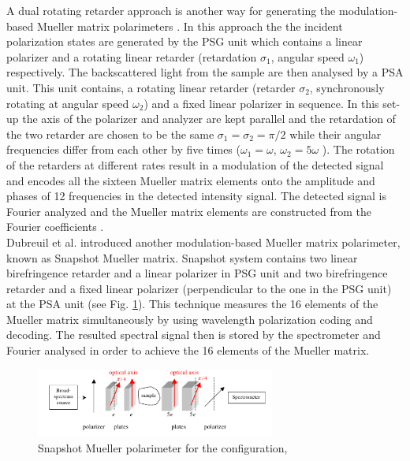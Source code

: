 \documentclass[oneside,a4,12p]{report} %
\begin{document}
A dual rotating retarder approach is another way for generating the modulation-based Mueller matrix polarimeters \cite{ghosh2011tissue,goldstein1992mueller,azzam1978photopolarimetric,smith2002optimization}. In this approach the the incident polarization states are generated by the PSG unit which contains a linear polarizer and a rotating linear retarder (retardation $\sigma_{1}$, angular speed $\omega_{1}$) respectively. The backscattered light from the sample are then analysed by a PSA unit. This unit contains, a rotating linear retarder (retarder $\sigma_{2}$, synchronously rotating at angular speed $\omega_{2}$) and a fixed linear polarizer in sequence. In this set-up the axis of the polarizer and analyzer are kept parallel and the retardation of the two retarder are chosen to be the same $\sigma_{1} = \sigma_{2}= \pi/2$ while their angular frequencies differ from each other by five times ($\omega_{1} = \omega$, $\omega_{2} = 5\omega$ ). The rotation of the retarders at different rates result in a modulation of the detected signal and encodes all the sixteen Mueller matrix elements onto the amplitude and phases of 12 frequencies in the detected intensity signal. The detected signal is Fourier analyzed and the Mueller matrix elements are constructed from the Fourier coefficients \cite{ghosh2011tissue,goldstein1992mueller,azzam1978photopolarimetric,smith2002optimization}. \\

Dubreuil et al. \cite{dubreuil2007snapshot} introduced another modulation-based Mueller matrix polarimeter, known as Snapshot Mueller matrix. Snapshot system contains two linear birefringence retarder and a linear polarizer in PSG unit and two birefringence retarder and a fixed linear polarizer (perpendicular to the one in the PSG unit) at the PSA unit (see Fig. \ref{fig:snaphotMueller}). This technique measures the 16 elements of the Mueller matrix simultaneously by using wavelength polarization coding and decoding. The resulted spectral signal then is stored by the spectrometer and Fourier analysed in order to achieve the 16 elements of the Mueller matrix. 

	\begin{figure}
	\centering 
	\includegraphics[width = 0.7\textwidth]{figures/snapshotMueller.png}	
	\caption{ Snapshot Mueller polarimeter for the configuration, \cite{dubreuil2007snapshot} }
	\label{fig:snaphotMueller}
	\end{figure}
	
\end{document}
